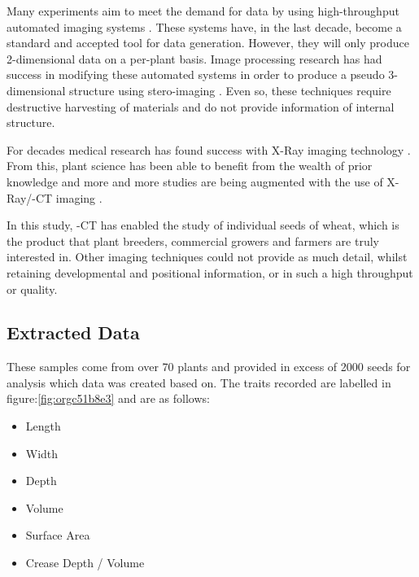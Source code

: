\documentclass[11pt]{report}
\begin{document}
Many experiments aim to meet the demand for data by using high-throughput automated imaging systems \cite{Naumann2007,Prasanna2013,Humplik2015}. These systems have, in the last decade, become a standard and accepted tool for data generation. However, they will only produce 2-dimensional data on a per-plant basis. Image processing research has had success in modifying these automated systems in order to produce a pseudo 3-dimensional structure using stero-imaging \cite{Roussel2016}. Even so, these techniques require destructive harvesting of materials and do not provide information of internal structure.

For decades medical research has found success with X-Ray imaging technology \cite{Wang2008}. From this, plant science has been able to benefit from the wealth of prior knowledge and more and more studies are being augmented with the use of X-Ray/\textmu{}-CT imaging \cite{Jhala2015,Tracy2012,Metzner2015,Hughes2017,Staedler2013}.

In this study, \textmu{}-CT has enabled the study of individual seeds of wheat, which is the product that plant breeders, commercial growers and farmers are truly interested in. Other imaging techniques could not provide as much detail, whilst retaining developmental and positional information, or in such a high throughput or quality.

\subsection{Extracted Data}
\label{sec:orge706e27}

These samples come from over 70 plants and provided in excess of 2000 seeds for analysis which data was created based on. The traits recorded are labelled in figure:\ref{fig:orgc51b8e3} and are as follows:

\begin{multicols}{2}

  \begin{itemize}
  \item Length
  \item Width
  \item Depth

  \end{itemize}

  \columnbreak

  \begin{itemize}
  \item Volume
  \item Surface Area
  \item Crease Depth / Volume
  \end{itemize}
\end{multicols}
\end{document}
